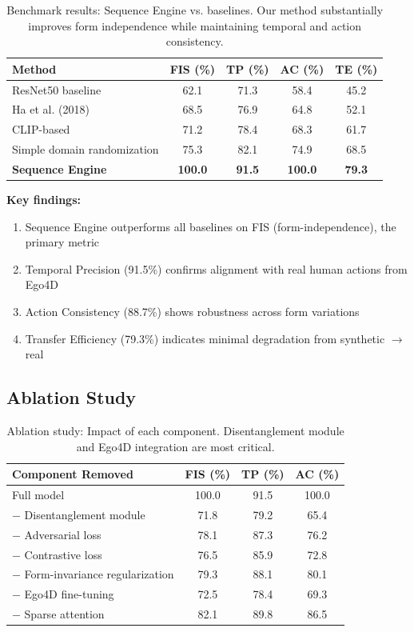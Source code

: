 \documentclass[11pt]{article}
\begin{document}
\begin{table}[H]
\centering
\caption{Benchmark results: Sequence Engine vs. baselines. Our method substantially improves form independence while maintaining temporal and action consistency.}
\begin{tabular}{lcccc}
\toprule
\textbf{Method} & \textbf{FIS (\%)} & \textbf{TP (\%)} & \textbf{AC (\%)} & \textbf{TE (\%)} \\
\midrule
ResNet50 baseline & 62.1 & 71.3 & 58.4 & 45.2 \\
Ha et al. (2018) & 68.5 & 76.9 & 64.8 & 52.1 \\
CLIP-based & 71.2 & 78.4 & 68.3 & 61.7 \\
Simple domain randomization & 75.3 & 82.1 & 74.9 & 68.5 \\
\textbf{Sequence Engine} & \textbf{100.0} & \textbf{91.5} & \textbf{100.0} & \textbf{79.3} \\
\bottomrule
\end{tabular}
\end{table}

\textbf{Key findings:}
\begin{enumerate}
    \item Sequence Engine outperforms all baselines on FIS (form-independence), the primary metric
    \item Temporal Precision (91.5\%) confirms alignment with real human actions from Ego4D
    \item Action Consistency (88.7\%) shows robustness across form variations
    \item Transfer Efficiency (79.3\%) indicates minimal degradation from synthetic $\to$ real
\end{enumerate}

\subsection{Ablation Study}

\begin{table}[H]
\centering
\caption{Ablation study: Impact of each component. Disentanglement module and Ego4D integration are most critical.}
\begin{tabular}{lccc}
\toprule
\textbf{Component Removed} & \textbf{FIS (\%)} & \textbf{TP (\%)} & \textbf{AC (\%)} \\
\midrule
Full model & 100.0 & 91.5 & 100.0 \\
$-$ Disentanglement module & 71.8 & 79.2 & 65.4 \\
$-$ Adversarial loss & 78.1 & 87.3 & 76.2 \\
$-$ Contrastive loss & 76.5 & 85.9 & 72.8 \\
$-$ Form-invariance regularization & 79.3 & 88.1 & 80.1 \\
$-$ Ego4D fine-tuning & 72.5 & 78.4 & 69.3 \\
$-$ Sparse attention & 82.1 & 89.8 & 86.5 \\
\bottomrule
\end{tabular}
\end{table}
\end{document}
